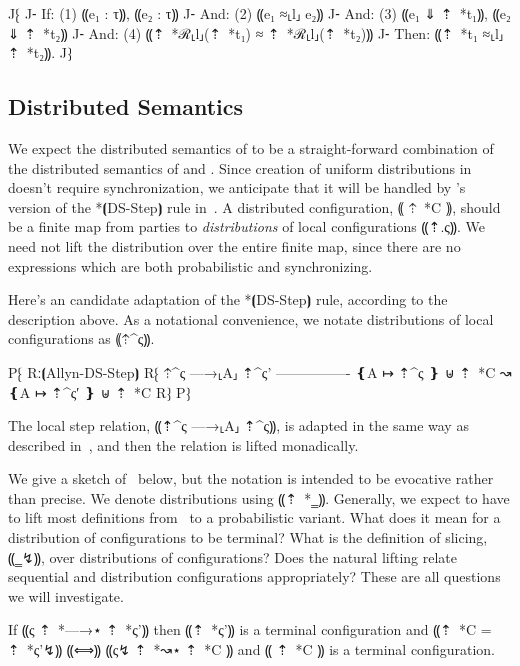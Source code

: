 \begin{theorem}[PMTO\%]\label{thm:lang-pmto}
  J⁅
  J⁃ If:  (1) ⸨e₁ : τ⸩, ⸨e₂ : τ⸩
  J⁃ And: (2) ⸨e₁ ≈⸤l⸥ e₂⸩
  J⁃ And: (3) ⸨e₁ ⇓ ⇡~*{t₁}⸩, ⸨e₂ ⇓ ⇡~*{t₂}⸩
  J⁃ And: (4) ⸨⇡~*ℛ⸤l⸥(⇡~*{t₁}) ≈ ⇡~*ℛ⸤l⸥(⇡~*{t₂})⸩
  J⁃ Then: ⸨⇡~*{t₁} ≈⸤l⸥ ⇡~*{t₂}⸩.
  J⁆
\end{theorem}

\subsection{Distributed Semantics}
\label{subsec:proposal-design-dist}

We expect the distributed semantics of \lang to be a straight-forward combination of the
distributed semantics of \mpc and \obliv. Since creation of uniform distributions in \lang doesn't
\lang require synchronization, we anticipate that it will be handled by \lang's version
of the *⦗DS-Step⦘ rule in~. A \lang distributed configuration, ⸨ ⇡~*C ⸩,
should be a finite map from parties to \emph{distributions} of local configurations ⸨⇡.ς⸩.
We need not lift the distribution over the entire finite map, since there are no expressions
which are both probabilistic and synchronizing.

Here's an candidate adaptation of the *⦗DS-Step⦘ rule, according to the description above. As
a notational convenience, we notate distributions of local configurations as ⸨⇡^ς⸩.

P⁅ Rː⦗Allyn-DS-Step⦘
   R⁅ ⇡^ς —→⸤A⸥ ⇡^{ς'}
      ----------------
      ❴A ↦ ⇡^ς ❵ ⊎ ⇡~*C ↝ ❴A ↦ ⇡^{ς′} ❵ ⊎ ⇡~*C
   R⁆
P⁆

The local step relation, ⸨⇡^ς —→⸤A⸥ ⇡^ς⸩, is adapted in the same way as described
in~, and then the relation is lifted monadically.

We give a sketch of~ below, but the notation is intended to be evocative rather
than precise. We denote distributions using ⸨⇡~*{‗}⸩. Generally, we expect to have to lift most definitions from~
to a probabilistic variant. What does it mean for a distribution of configurations to be terminal? What is the definition of slicing, ⸨‗↯⸩,
over distributions of configurations? Does the natural lifting relate sequential and distribution configurations appropriately? These
are all questions we will investigate.

\begin{theorem}\label{thm:lang-simulation}
    If ⸨ς ⇡~*{—→}⋆ ⇡~*{ς'}⸩ then ⸨⇡~*{ς'}⸩ is a terminal configuration and ⸨⇡~*C = ⇡~*{ς'}↯⸩ ⸨⟺⸩ ⸨ς↯ ⇡~*{↝}⋆ ⇡~*C ⸩ and ⸨ ⇡~*C ⸩ is a terminal configuration.
\end{theorem}

